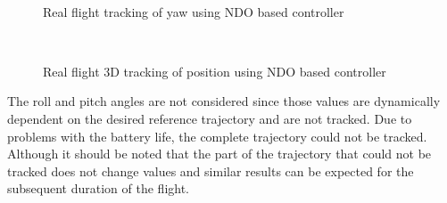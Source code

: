 \documentclass[letterpaper%
, twoside%
, 12pt%
,memoire%
, english%
,creativecommons,hyperref%
]{thETS}
\begin{document}
\begin{figure}[H]
	\centering
	 \\ \parbox{0.75\textwidth}{\caption{Real flight tracking of yaw using NDO based controller\label{Fig:yawtracNDO}}}
\end{figure}
\begin{figure}[H]
	\centering
	 \\ \parbox{0.75\textwidth}{\caption{Real flight 3D tracking of position using NDO based controller\label{Fig:3dNDO}}}
\end{figure}
The roll and pitch angles are not considered since those values are dynamically dependent on the desired reference trajectory and are not tracked. Due to problems with the battery life, the complete trajectory could not be tracked. Although it should be noted that the part of the trajectory that could not be tracked does not change values and similar results can be expected for the subsequent duration of the flight. \\
\end{document}

